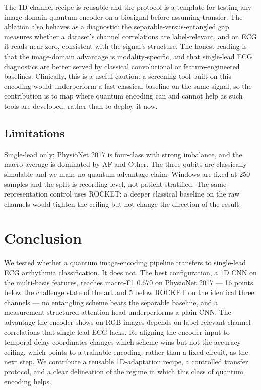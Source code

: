 \documentclass[conference,compsoc]{IEEEtran}
\begin{document}
The 1D channel recipe is reusable and the protocol is a template for testing any image-domain quantum encoder on a biosignal before assuming transfer. The ablation also behaves as a diagnostic: the separable-versus-entangled gap measures whether a dataset's channel correlations are label-relevant, and on ECG it reads near zero, consistent with the signal's structure. The honest reading is that the image-domain advantage is modality-specific, and that single-lead ECG diagnostics are better served by classical convolutional or feature-engineered baselines. Clinically, this is a useful caution: a screening tool built on this encoding would underperform a fast classical baseline on the same signal, so the contribution is to map where quantum encoding can and cannot help as such tools are developed, rather than to deploy it now.

\subsection{Limitations}

Single-lead only; PhysioNet 2017 is four-class with strong imbalance, and the macro average is dominated by AF and Other. The three qubits are classically simulable and we make no quantum-advantage claim. Windows are fixed at 250 samples and the split is recording-level, not patient-stratified. The same-representation control uses ROCKET; a deeper classical baseline on the raw channels would tighten the ceiling but not change the direction of the result.

\section{Conclusion}
\label{sec:conclusion}

We tested whether a quantum image-encoding pipeline transfers to single-lead ECG arrhythmia classification. It does not. The best configuration, a 1D CNN on the multi-basis features, reaches macro-F1 0.670 on PhysioNet 2017 --- 16 points below the challenge state of the art and 5 below ROCKET on the identical three channels --- no entangling scheme beats the separable baseline, and a measurement-structured attention head underperforms a plain CNN. The advantage the encoder shows on RGB images depends on label-relevant channel correlations that single-lead ECG lacks. Re-aligning the encoder input to temporal-delay coordinates changes which scheme wins but not the accuracy ceiling, which points to a trainable encoding, rather than a fixed circuit, as the next step. We contribute a reusable 1D-adaptation recipe, a controlled transfer protocol, and a clear delineation of the regime in which this class of quantum encoding helps.
\end{document}
